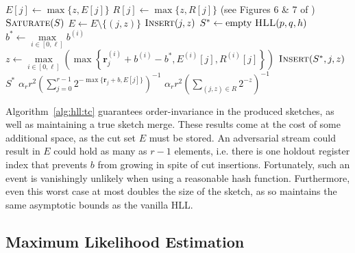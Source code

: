 \documentclass[10]{article}
\newcommand{\algoname}[1]{\textnormal{\textsc{#1}}}
\begin{document}
\begin{algorithm}[htbp]
\begin{algorithmic}[1]
				\State $E[j] \gets \max \{z, E[j]\}$
			\EndIf
		\ElsIf {$\nu = \algoname{sparse}$}
			\State $R[j] \gets \max \{z, R[j]\}$ (see Figures 6 \& 7 of \cite{heule2013hyperloglog})
				\State $\algoname{Saturate}(S)$
			\EndIf
		\EndIf
	\EndFunction
%
			\State $E \gets E \setminus \{(j, z)\}$
			\State $\algoname{Insert}(j, z)$
		\EndFor
	\EndFunction
%
%
		\State $S^* \gets \text{empty $\algoname{HLL}(p, q, h)$}$
		\For{$j \in [0,r)$} 
			\State $b^* \gets \max\limits_{i \in [0, \ell]} b^{(i)}$
			\State $z \gets  \max\limits_{ i \in [0, \ell]} \left ( \max \left \{ \mathbf{r}^{(i)}_j + b^{(i)} - b^{*}, E^{(i)}[j], R^{(i)}[j] \right \} \right )$
				\State $\algoname{Insert}(S^*, j, z)$
			\EndIf
		\EndFor
		\State \Return $S^*$
	\EndFunction
%
		\If{$\nu = \algoname{dense}$}
			\State \Return $\alpha_r r^2 \left ( \sum\limits_{j=0}^{r-1} 2^{-\max \{ \mathbf{r}_j + b, E[j]\}} \right) ^{-1}$
		\Else
			\State \Return $\alpha_r r^2 \left ( \sum\limits_{(j, z) \in R} 2^{-z} \right) ^{-1}$
		\EndIf
	\EndFunction
\end{algorithmic}
\end{algorithm}


Algorithm~\ref{alg:hll:tc} guarantees order-invariance in the produced sketches, as well as maintaining a true sketch merge.
These results come at the cost of some additional space, as the cut set $E$ must be stored.
An adversarial stream could result in $E$ could hold as many as $r-1$ elements, i.e. there is one holdout register index that prevents $b$ from growing in spite of cut insertions. 
Fortunately, such an event is vanishingly unlikely when using a reasonable hash function. 
Furthermore, even this worst case at most doubles the size of the sketch, as so maintains the same asymptotic bounds as the vanilla \algoname{HLL}.


\subsection{Maximum Likelihood Estimation}
 \label{DS:sec:HLL:MLE}
\end{document}
